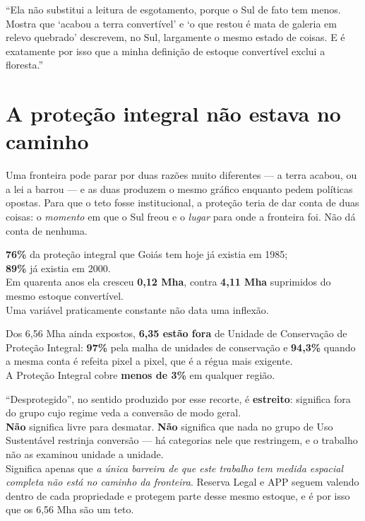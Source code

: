 \begin{nabanca}
``Ela não substitui a leitura de esgotamento, porque o Sul de fato tem menos.
Mostra que `acabou a terra convertível' e `o que restou é mata de galeria em
relevo quebrado' descrevem, no Sul, largamente o mesmo estado de coisas. E é
exatamente por isso que a minha definição de estoque convertível exclui a
floresta.''
\end{nabanca}

\section{A proteção integral não estava no caminho}

Uma fronteira pode parar por duas razões muito diferentes --- a terra acabou, ou
a lei a barrou --- e as duas produzem o mesmo gráfico enquanto pedem políticas
opostas. Para que o teto fosse institucional, a proteção teria de dar conta de
duas coisas: o \emph{momento} em que o Sul freou e o \emph{lugar} para onde a
fronteira foi. Não dá conta de nenhuma.

\begin{ancora}
\textbf{76\%} da proteção integral que Goiás tem hoje já existia em 1985; \\
\textbf{89\%} já existia em 2000. \\
Em quarenta anos ela cresceu \textbf{0,12 Mha}, contra \textbf{4,11 Mha}
suprimidos do mesmo estoque convertível. \\
Uma variável praticamente constante não data uma inflexão.
\end{ancora}

\begin{ancora}
Dos 6,56 Mha ainda expostos, \textbf{6,35 estão fora} de Unidade de Conservação
de Proteção Integral: \textbf{97\%} pela malha de unidades de conservação e
\textbf{94,3\%} quando a mesma conta é refeita pixel a pixel, que é a régua mais
exigente. \\
A Proteção Integral cobre \textbf{menos de 3\%} em qualquer região.
\end{ancora}

\begin{naodiz}
``Desprotegido'', no sentido produzido por esse recorte, é \textbf{estreito}:
significa fora do grupo cujo regime veda a conversão de modo geral. \\[4pt]
\textbf{Não} significa livre para desmatar. \textbf{Não} significa que nada no
grupo de Uso Sustentável restrinja conversão --- há categorias nele que
restringem, e o trabalho não as examinou unidade a unidade. \\[4pt]
Significa apenas que \emph{a única barreira de que este trabalho tem medida
espacial completa não está no caminho da fronteira}. Reserva Legal e APP seguem
valendo dentro de cada propriedade e protegem parte desse mesmo estoque, e é
por isso que os 6,56 Mha são um teto.
\end{naodiz}

